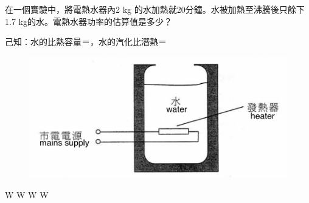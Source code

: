 {
    在一個實驗中，將電熱水器內2 kg 的水加熱就20分鐘。水被加熱至沸騰後只餘下1.7 kg的水。電熱水器功率的估算值是多少？
    \par 己知：水的比熱容量＝，水的汽化比潛熱＝
    \begin{figure}[h]
        \centering
        \includegraphics[width=0.35\linewidth]{assets/Screenshot 2023-09-13 at 10.23.39 PM.png}
    \end{figure}
    \begin{choices}
         W
         W
         W
         W
    \end{choices}
}{}

